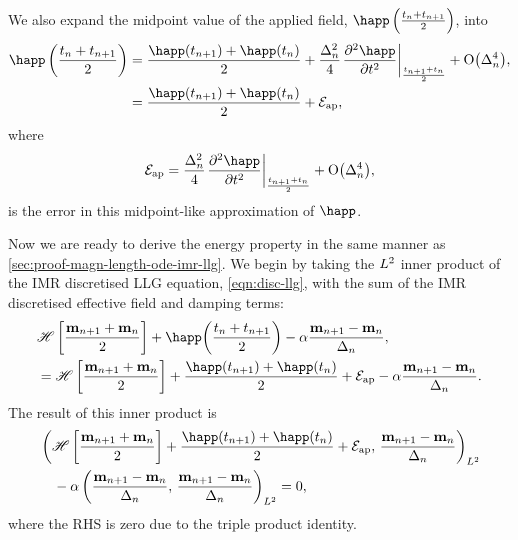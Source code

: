 We also expand the midpoint value of the applied field, $\mphapp$, into
\begin{equation}
  \begin{aligned}
    \mphapp &= \frac{\happ(t_{n+1}) + \happ(t_n)}{2}
    + \frac{\dtn^2}{4} \evalatb{\spd{\happ}{t}}{\frac{t_{n+1} + t_n}{2}}  + \order{\dtn^4}, \\
    &= \frac{\happ(t_{n+1}) + \happ(t_n)}{2} + \happerror,
    \label{eq:happ-midpoint}
  \end{aligned}
\end{equation}
where
\begin{equation}
  \happerror = \frac{\dtn^2}{4} \evalatb{\spd{\happ}{t}}{\frac{t_{n+1} + t_n}{2}}  + \order{\dtn^4},
\end{equation}
is the error in this midpoint-like approximation of $\happ$.

Now we are ready to derive the energy property in the same manner as \cref{sec:proof-magn-length-ode-imr-llg}.
We begin by taking the ${L^2}$ inner product of the IMR discretised LLG equation, \cref{eqn:disc-llg}, with the sum of the IMR discretised effective field and damping terms:
\begin{equation}
  \begin{aligned}
  & \mphop + \happ\bigb{\mpt} - \dampc \mpdmdt, \\
  &= \mphop + \frac{\happ(t_{n+1}) + \happ(t_n)}{2} + \happerror - \dampc \mpdmdt.
  \end{aligned}
\end{equation}
The result of this inner product is
\begin{equation}
  \begin{aligned}
    &\ltip{\mphop + \frac{\happ(t_{n+1}) + \happ(t_n)}{2} + \happerror}{\mpdmdt} \\
    & \quad - \dampc \ltip{\mpdmdt}{\mpdmdt} = 0,
    \label{eq:54}
  \end{aligned}
\end{equation}
where the RHS is zero due to the triple product identity.

